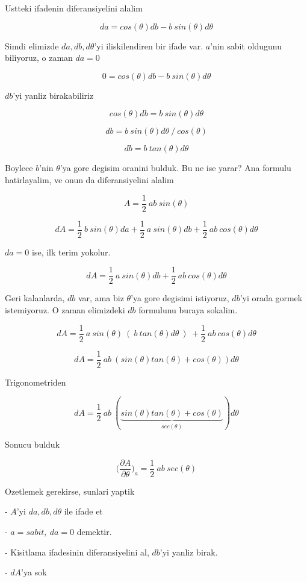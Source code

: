 \documentclass[12pt,fleqn]{article}
\begin{document}
Ustteki ifadenin diferansiyelini alalim

\[ da = cos(\theta) db - b \ sin(\theta) d\theta \]

Simdi elimizde $da,db,d\theta$'yi iliskilendiren bir ifade var. $a$'nin
sabit oldugunu biliyoruz, o zaman $da=0$

\[ 0 = cos(\theta) db - b \ sin(\theta) d\theta \]

$db$'yi yanliz birakabiliriz

\[ cos(\theta) db = b \ sin(\theta) d\theta \]

\[ db = b \ sin(\theta) d\theta \ / \ cos(\theta) \]

\[ db = b \ tan(\theta) d\theta  \]

Boylece $b$'nin $\theta$'ya gore degisim oranini bulduk. Bu ne ise yarar?
Ana formulu hatirlayalim, ve onun da diferansiyelini alalim

\[ A = \frac{1}{2} \ ab \ sin(\theta) \]

\[ dA = \frac{1}{2} \ b \ sin(\theta) da + 
\frac{1}{2} \ a \ sin(\theta) db + 
\frac{1}{2} \ ab \ cos(\theta)d\theta
 \]

$da = 0$ ise, ilk terim yokolur. 

\[ dA = 
\frac{1}{2} \ a \ sin(\theta) db + 
\frac{1}{2} \ ab \ cos(\theta)d\theta
 \]

Geri kalanlarda, $db$ var, ama biz $\theta$'ya gore degisimi istiyoruz,
$db$'yi orada gormek istemiyoruz. O zaman elimizdeki $db$ formulunu buraya
sokalim. 

\[ dA =  
\frac{1}{2} \ a \ sin(\theta) \ ( \ b \ tan(\theta) d\theta \ ) \ + 
\frac{1}{2} \ ab \ cos(\theta)d\theta
\]

\[ dA =  
\frac{1}{2} \ ab \ (sin(\theta) tan(\theta) +  cos (\theta) )d\theta
\]

Trigonometriden 

\[ dA =  
\frac{1}{2} \ ab \ (
\underbrace{sin(\theta) tan(\theta) +  cos (\theta)}_{sec(\theta)}
)d\theta
\]

Sonucu bulduk 

\[ \bigg( \frac{\partial A}{\partial \theta} \bigg)_{a} = 
\frac{1}{2} \ ab \ sec(\theta)
 \]

Ozetlemek gerekirse, sunlari yaptik

- $A$'yi $da,db,d\theta$ ile ifade et

- $a=sabit, \ da=0$ demektir.

- Kisitlama ifadesinin diferansiyelini al, $db$'yi yanliz birak. 

- $dA$'ya sok
\end{document}
